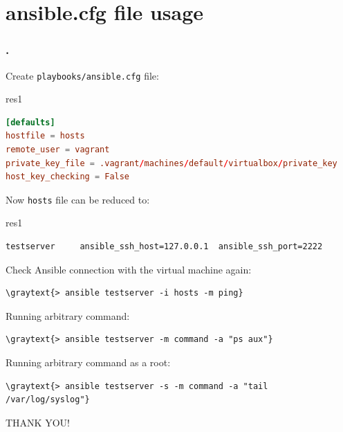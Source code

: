 \documentclass[pdf, 8pt, unicode, t]{beamer} %
\newcommand{\bluetext}[1]{{\usebeamercolor[fg]{bluetext_color}#1}}
\newcommand{\graytext}[1]{{\usebeamercolor[fg]{graytext_color}#1}}
\newcommand{\frametitlesection}{\frametitle{\thesection. \secname}}
\begin{document}
\section{ansible.cfg file usage }
\begin{frame}[fragile]
\frametitlesection
Create \verb|playbooks/ansible.cfg| file:

\hspace{1em}
\begin{beamercolorbox}[wd=0.75\textwidth,sep=-0.5em,rounded=true,shadow=true,center]{res1}
\begin{lstlisting}[language=conf]
[defaults]
hostfile = hosts
remote_user = vagrant
private_key_file = .vagrant/machines/default/virtualbox/private_key
host_key_checking = False
\end{lstlisting}
\end{beamercolorbox}

\vspace{2em}
Now \verb|hosts| file can be reduced to:

\hspace{1em}
\begin{beamercolorbox}[wd=0.75\textwidth,sep=-0.5em,rounded=true,shadow=true,center]{res1}
\small
\begin{Verbatim}
testserver     ansible_ssh_host=127.0.0.1  ansible_ssh_port=2222
\end{Verbatim}
\end{beamercolorbox}

\vspace{1.5em}
\normalsize
Check Ansible connection with the virtual machine again:
\begin{Verbatim}[commandchars=\\\{\}]
\graytext{> ansible testserver -i hosts -m ping}
\end{Verbatim}

\vspace{1em}
Running arbitrary command:
\begin{Verbatim}[commandchars=\\\{\}]
\graytext{> ansible testserver -m command -a "ps aux"}
\end{Verbatim}

\vspace{1em}
Running arbitrary command as a root:
\begin{Verbatim}[commandchars=\\\{\}]
\graytext{> ansible testserver -s -m command -a "tail /var/log/syslog"}
\end{Verbatim}
\end{frame}
\begin{frame}[plain,c,label=thanks]
\begin{center}
\textrm{\bluetext{\Large THANK YOU!}}
\end{center}
\end{frame}
\end{document}
